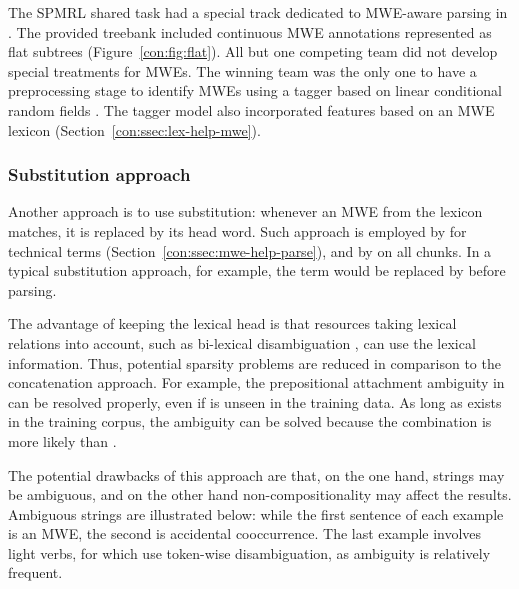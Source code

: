 \documentclass[output=paper]{langsci/langscibook}
\begin{document}
The SPMRL shared task \citep{seddah13} had a special track dedicated to MWE-aware parsing in . The provided treebank included continuous MWE annotations represented as flat subtrees (Figure~\ref{con:fig:flat}). All but one competing team did not develop special treatments for MWEs. The winning team was the only one to have a preprocessing stage to identify MWEs using a tagger based on linear conditional random fields \citep{constant13mwe}. The tagger model also incorporated features based on an MWE lexicon (Section~\ref{con:ssec:lex-help-mwe}).

\subsubsection{Substitution approach}
\label{con:ssec:subst}


Another approach is to use substitution: whenever an MWE from the lexicon 
matches, it is replaced by its head word. Such approach is employed by \cite{weeds-ea07} for technical terms (Section~\ref{con:ssec:mwe-help-parse}), and by \citet{schneiderphd} on all chunks.
In a typical substitution approach, for example, the term  would be replaced by  before parsing. 

The advantage of keeping the lexical head is that resources taking lexical relations into account, such as bi-lexical disambiguation \citep{collins99}, can use the lexical information. Thus, potential sparsity problems are reduced in comparison to the concatenation approach. For example, the prepositional  attachment ambiguity in 
can be resolved properly, even if  is unseen in the training data. As long as  exists in the training corpus, the ambiguity can be solved because the combination  is more likely than . 

The potential drawbacks of this approach are that, on the one hand, strings may be ambiguous, and on the other hand non-compositionality may affect the results. 
Ambiguous strings are illustrated below: while the first sentence of each example is an MWE, the second is accidental cooccurrence. The last example involves light verbs, for which \citet{tu-roth:2011:mwe} use token-wise disambiguation, as ambiguity is relatively frequent. 
\end{document}
